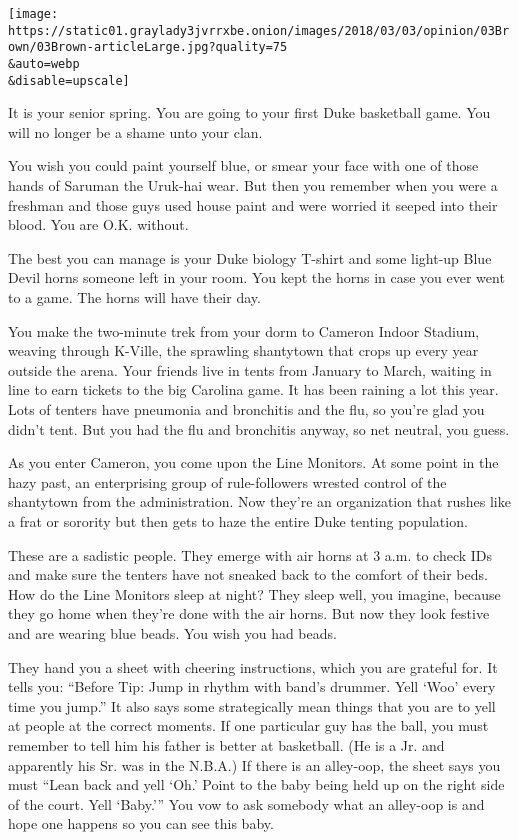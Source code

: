 \texttt{[image: https://static01.graylady3jvrrxbe.onion/images/2018/03/03/opinion/03Brown/03Brown-articleLarge.jpg?quality=75\\\&auto=webp\\\&disable=upscale]}

It is your senior spring. You are going to your first Duke basketball
game. You will no longer be a shame unto your clan.

You wish you could paint yourself blue, or smear your face with one of
those hands of Saruman the Uruk-hai wear. But then you remember when you
were a freshman and those guys used house paint and were worried it
seeped into their blood. You are O.K. without.

The best you can manage is your Duke biology T-shirt and some light-up
Blue Devil horns someone left in your room. You kept the horns in case
you ever went to a game. The horns will have their day.

You make the two-minute trek from your dorm to Cameron Indoor Stadium,
weaving through K-Ville, the sprawling shantytown that crops up every
year outside the arena. Your friends live in tents from January to
March, waiting in line to earn tickets to the big Carolina game. It has
been raining a lot this year. Lots of tenters have pneumonia and
bronchitis and the flu, so you're glad you didn't tent. But you had the
flu and bronchitis anyway, so net neutral, you guess.

As you enter Cameron, you come upon the Line Monitors. At some point in
the hazy past, an enterprising group of rule-followers wrested control
of the shantytown from the administration. Now they're an organization
that rushes like a frat or sorority but then gets to haze the entire
Duke tenting population.

These are a sadistic people. They emerge with air horns at 3 a.m. to
check IDs and make sure the tenters have not sneaked back to the comfort
of their beds. How do the Line Monitors sleep at night? They sleep well,
you imagine, because they go home when they're done with the air horns.
But now they look festive and are wearing blue beads. You wish you had
beads.

They hand you a sheet with cheering instructions, which you are grateful
for. It tells you: ``Before Tip: Jump in rhythm with band's drummer.
Yell `Woo' every time you jump.'' It also says some strategically mean
things that you are to yell at people at the correct moments. If one
particular guy has the ball, you must remember to tell him his father is
better at basketball. (He is a Jr. and apparently his Sr. was in the
N.B.A.) If there is an alley-oop, the sheet says you must ``Lean back
and yell `Oh.' Point to the baby being held up on the right side of the
court. Yell `Baby.''' You vow to ask somebody what an alley-oop is and
hope one happens so you can see this baby.

